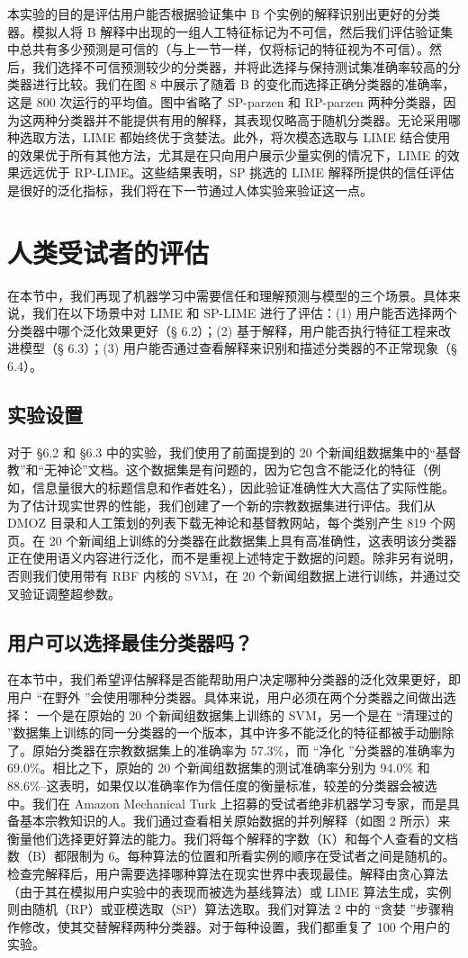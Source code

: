 \documentclass[12pt, a4paper]{ctexart} %
\begin{document}
本实验的目的是评估用户能否根据验证集中 B 个实例的解释识别出更好的分类器。模拟人将 B 解释中出现的一组人工特征标记为不可信，然后我们评估验证集中总共有多少预测是可信的（与上一节一样，仅将标记的特征视为不可信）。然后，我们选择不可信预测较少的分类器，并将此选择与保持测试集准确率较高的分类器进行比较。我们在图 8 中展示了随着 B 的变化而选择正确分类器的准确率，这是 800 次运行的平均值。图中省略了 SP-parzen 和 RP-parzen 两种分类器，因为这两种分类器并不能提供有用的解释，其表现仅略高于随机分类器。无论采用哪种选取方法，LIME 都始终优于贪婪法。此外，将次模态选取与 LIME 结合使用的效果优于所有其他方法，尤其是在只向用户展示少量实例的情况下，LIME 的效果远远优于 RP-LIME。这些结果表明，SP 挑选的 LIME 解释所提供的信任评估是很好的泛化指标，我们将在下一节通过人体实验来验证这一点。

\section{人类受试者的评估}
在本节中，我们再现了机器学习中需要信任和理解预测与模型的三个场景。具体来说，我们在以下场景中对 LIME 和 SP-LIME 进行了评估：(1) 用户能否选择两个分类器中哪个泛化效果更好（§ 6.2）；(2) 基于解释，用户能否执行特征工程来改进模型（§ 6.3）；(3) 用户能否通过查看解释来识别和描述分类器的不正常现象（§ 6.4）。
\subsection{实验设置}
对于 §6.2 和 §6.3 中的实验，我们使用了前面提到的 20 个新闻组数据集中的“基督教”和“无神论”文档。这个数据集是有问题的，因为它包含不能泛化的特征（例如，信息量很大的标题信息和作者姓名），因此验证准确性大大高估了实际性能。为了估计现实世界的性能，我们创建了一个新的宗教数据集进行评估。我们从 DMOZ 目录和人工策划的列表下载无神论和基督教网站，每个类别产生 819 个网页。在 20 个新闻组上训练的分类器在此数据集上具有高准确性，这表明该分类器正在使用语义内容进行泛化，而不是重视上述特定于数据的问题。除非另有说明，否则我们使用带有 RBF 内核的 SVM，在 20 个新闻组数据上进行训练，并通过交叉验证调整超参数。
\subsection{用户可以选择最佳分类器吗？}
在本节中，我们希望评估解释是否能帮助用户决定哪种分类器的泛化效果更好，即用户 “在野外 ”会使用哪种分类器。具体来说，用户必须在两个分类器之间做出选择： 一个是在原始的 20 个新闻组数据集上训练的 SVM，另一个是在 “清理过的 ”数据集上训练的同一分类器的一个版本，其中许多不能泛化的特征都被手动删除了。原始分类器在宗教数据集上的准确率为 57.3\%，而 “净化 ”分类器的准确率为 69.0\%。相比之下，原始的 20 个新闻组数据集的测试准确率分别为 94.0\% 和 88.6\%--这表明，如果仅以准确率作为信任度的衡量标准，较差的分类器会被选中。我们在 Amazon Mechanical Turk 上招募的受试者绝非机器学习专家，而是具备基本宗教知识的人。我们通过查看相关原始数据的并列解释（如图 2 所示）来衡量他们选择更好算法的能力。我们将每个解释的字数（K）和每个人查看的文档数（B）都限制为 6。每种算法的位置和所看实例的顺序在受试者之间是随机的。检查完解释后，用户需要选择哪种算法在现实世界中表现最佳。解释由贪心算法（由于其在模拟用户实验中的表现而被选为基线算法）或 LIME 算法生成，实例则由随机（RP）或亚模选取（SP）算法选取。我们对算法 2 中的 “贪婪 ”步骤稍作修改，使其交替解释两种分类器。对于每种设置，我们都重复了 100 个用户的实验。
\end{document}
